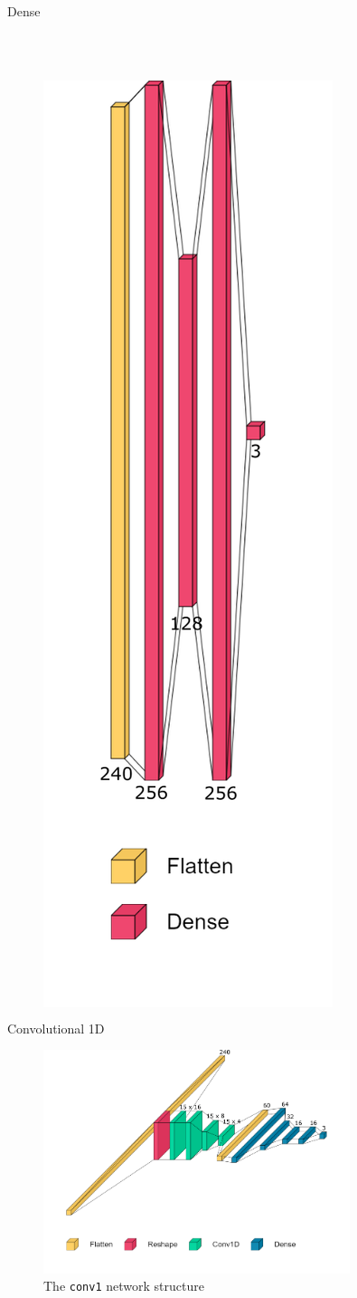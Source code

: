 \documentclass[10pt, xcolor={dvipsnames}]{beamer}
\begin{document}
\begin{frame}{Dense}
\begin{columns}
        \begin{figure}
            \centering
            \includegraphics[height=1.2\textwidth]{assets/nets/seq2.png}
            \caption*{The \alert{\texttt{seq2}} network structure}
        \end{figure}
    \end{columns}
    
\end{frame}

\begin{frame}{Convolutional 1D}
    \begin{figure}
    \centering
    \includegraphics[width=0.8\textwidth]{assets/nets/conv1.png}
    \caption*{The \alert{\texttt{conv1}} network structure}
    \end{figure}
\end{frame}
\end{document}
